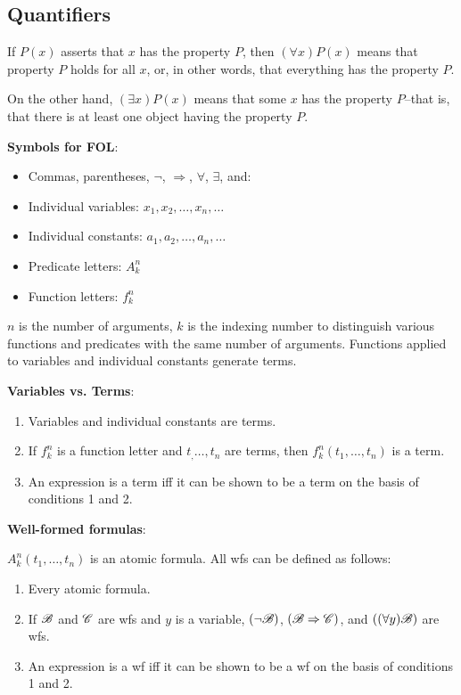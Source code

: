 \subsection{Quantifiers}

If $P(x)$ asserts that $x$ has the property $P$, then $(\forall x)P(x)$ means that property $P$ holds for all $x$, or, in other words, that everything has the property $P$.

\noindent
On the other hand, $(\exists x) P(x)$ means that some $x$ has the property $P$--that is, that there is at least one object having the property $P$. 

\noindent
\textbf{Symbols for FOL}:

\begin{itemize}
  \item Commas, parentheses, $\lnot$, $\Rightarrow$, $\forall$, $\exists$, and:
  \item Individual variables: $x_1,x_2,\dots, x_n, \dots$
  \item Individual constants: $a_1, a_2, \dots, a_n, \dots$
  \item Predicate letters: $A_k^n$
  \item Function letters: $f_k^n$
\end{itemize}

\noindent
$n$ is the number of arguments, $k$ is the indexing number to distinguish various functions and predicates with the same number of arguments. Functions applied to variables and individual constants generate terms.

\noindent
\textbf{Variables vs. Terms}:

\begin{enumerate}
  \item Variables and individual constants are terms.
  \item If $f_k^n$ is a function letter and $t_, \dots, t_n$ are terms, then $f_k^n(t_1, \dots, t_n)$ is a term.
  \item An expression is a term iff it can be shown to be a term on the basis of conditions 1 and 2.
\end{enumerate} 

\noindent
\textbf{Well-formed formulas}:

\noindent
$A_k^n(t_1, \dots, t_n)$ is an atomic formula. All wfs can be defined as follows:

\begin{enumerate}
    \item Every atomic formula.
    \item If $\mathscr{B}$ and $\mathscr{C}$ are wfs and $y$ is a variable, $(\lnot \mathscr{B})$, $(\mathscr{B} \Rightarrow \mathscr{C})$, and $((\forall y)\mathscr{B})$ are wfs.
    \item An expression is a wf iff it can be shown to be a wf on the basis of conditions 1 and 2.
\end{enumerate}


